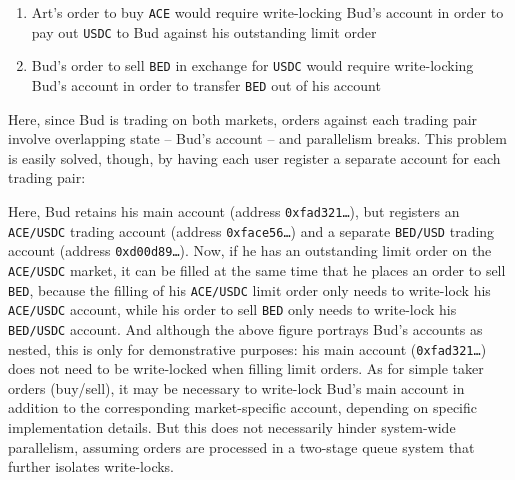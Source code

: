 \documentclass{scrartcl}
\begin{document}
\begin{enumerate}
    \item Art's order to buy \texttt{ACE} would require write-locking Bud's account in order to pay out \texttt{USDC} to Bud against his outstanding limit order
    \item Bud's order to sell \texttt{BED} in exchange for \texttt{USDC} would require write-locking Bud's account in order to transfer \texttt{BED} out of his account
\end{enumerate}

Here, since Bud is trading on both markets, orders against each trading pair involve overlapping state -- Bud's account -- and parallelism breaks.
This problem is easily solved, though, by having each user register a separate account for each trading pair:

\begin{center}
\end{center}

Here, Bud retains his main account (address \texttt{0xfad321\ldots}), but registers an \texttt{ACE/USDC} trading account (address \texttt{0xface56\ldots}) and a separate \texttt{BED/USD} trading account (address \texttt{0xd00d89\ldots}).
Now, if he has an outstanding limit order on the \texttt{ACE/USDC} market, it can be filled at the same time that he places an order to sell \texttt{BED}, because the filling of his \texttt{ACE/USDC} limit order only needs to write-lock his \texttt{ACE/USDC} account, while his order to sell \texttt{BED} only needs to write-lock his \texttt{BED/USDC} account.
And although the above figure portrays Bud's accounts as nested, this is only for demonstrative purposes:
his main account (\texttt{0xfad321\ldots}) does not need to be write-locked when filling limit orders.
As for simple taker orders (buy/sell), it may be necessary to write-lock Bud's main account in addition to the corresponding market-specific account, depending on specific implementation details.
But this does not necessarily hinder system-wide parallelism, assuming orders are processed in a two-stage queue system that further isolates write-locks.
\end{document}
